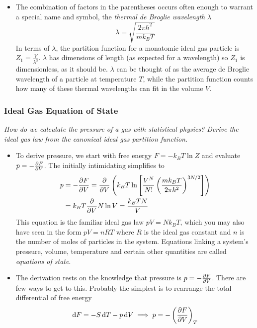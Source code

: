 \documentclass[11pt, a4paper]{article}
\newcommand{\diff}{\mathop{}\!\mathrm{d}} %
\newcommand{\pdveval}[3]{\left(\pdv{#1}{#2}\right)_{#3}}
\begin{document}
\begin{itemize}
	\item The combination of factors in the parentheses occurs often enough to warrant a special name and symbol, the \textit{thermal de Broglie wavelength} $ \lambda $
	\begin{equation*}
		\lambda = \sqrt{\frac{2\pi \hbar^{2}}{mk_{B}T}}
	\end{equation*}
	In terms of $ \lambda $, the partition function for a monatomic ideal gas particle is $ Z_{1} = \frac{V}{\lambda^{3}} $. $ \lambda $ has dimensions of length (as expected for a wavelength) so $ Z_{1} $ is dimensionless, as it should be. $ \lambda $ can be thought of as the average de Broglie wavelength of a particle at temperature $ T $, while the partition function counts how many of these thermal wavelengths can fit in the volume $ V $.

	
	
\end{itemize}


\subsubsection{Ideal Gas Equation of State} \label{sss:ideal_gas_eq_state}
\textit{How do we calculate the pressure of a gas with statistical physics? Derive the ideal gas law from the canonical ideal gas partition function.}
\begin{itemize}
	
	\item To derive pressure, we start with free energy $ F = - k_{B}T \ln Z $ and evaluate $ p = - \pdv{F}{V} $. The initially intimidating simplifies to
	\begin{align*}
		p &= -\pdv{F}{V} = \pdv{}{V}\left( k_{B}T \ln\left [\frac{V^{N}}{N!} \left(\frac{mk_{B}T}{2\pi \hbar^{2}}\right)^{3N/2}\right ]\right)  \\
		&= k_{B} T\pdv{}{V} N \ln V = \frac{k_{B}T N}{V}
	\end{align*}
	This equation is the familiar ideal gas law $ pV = N k_{B}T $, which you may also have seen in the form $ pV = nRT $ where $ R $ is the ideal gas constant and $ n $ is the number of moles of particles in the system. Equations linking a system's pressure, volume, temperature and certain other quantities are called \textit{equations of state}. 
	
	\item The derivation rests on the knowledge that pressure is $ p = - \pdv{F}{V} $. There are few ways to get to this. Probably the simplest is to rearrange the total differential of free energy 
	\begin{equation*}
		\diff F = - S \diff T - p \diff V \implies p = -\pdveval{F}{V}{T}
	\end{equation*}
\end{itemize}
\end{document}
